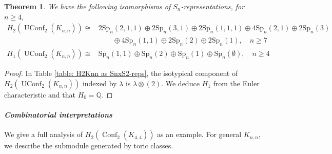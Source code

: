 \documentclass[12pt]{amsart}
\newtheorem{thm}{Theorem}[section]
\theoremstyle{definition}
\newcommand{\Q}{\mathbb{Q}}
\newcommand{\conf}{\operatorname{Conf}}
\newcommand{\uconf}{\operatorname{UConf}}
\begin{document}



\begin{thm}
We have the following isomorphisms of $S_n$-representations, for $n\geq 4$,
\begin{align*}
H_2(\uconf_2(K_{n,n})) \cong & 2\mathrm{Sp}_n(2,1,1) \oplus 2\mathrm{Sp}_n(3,1) \oplus 2\mathrm{Sp}_n(1,1,1) \oplus 4\mathrm{Sp}_n(2,1)\oplus 2\mathrm{Sp}_n(3) \\
& \qquad \oplus 4\mathrm{Sp}_n(1,1) \oplus 2\mathrm{Sp}_n(2)\oplus 2\mathrm{Sp}_n(1), \quad n\geq 7\\
H_1(\uconf_2(K_{n,n}))\cong & \mathrm{Sp}_n(1,1)\oplus \mathrm{Sp}_n(2)\oplus \mathrm{Sp}_n(1)\oplus \mathrm{Sp}_n(\emptyset),\quad n\geq 4
\end{align*}
\end{thm}

\begin{proof}
In Table \ref{table: H2Knn as SnxS2-reps}, the isotypical component of $H_2(\uconf_2(K_{n,n}))$ indexed by $\lambda$ is $\lambda\otimes (2)$. We deduce $H_1$ from the Euler characteristic and that $H_0=\Q$.
\end{proof}

\paragraph{\textit{Combinatorial interpretations}} We give a full analysis of $H_2(\conf_2(K_{4,4}))$ as an example. For general $K_{n,n}$, we describe the submodule generated by toric classes.
\end{document}
